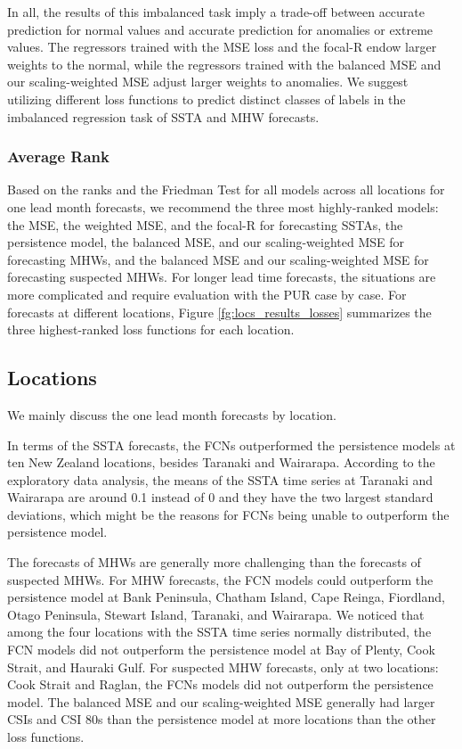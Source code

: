 \documentclass[11pt, a4paper]{article}
\begin{document}
In all, the results of this imbalanced task imply a trade-off between accurate prediction for normal values and accurate prediction for anomalies or extreme values. The regressors trained with the MSE loss and the focal-R endow larger weights to the normal, while the regressors trained with the balanced MSE and our scaling-weighted MSE adjust larger weights to anomalies. We suggest utilizing different loss functions to predict distinct classes of labels in the imbalanced regression task of SSTA and MHW forecasts.

\subsubsection{Average Rank}

Based on the ranks and the Friedman Test for all models across all locations for one lead month forecasts, we recommend the three most highly-ranked models: the MSE, the weighted MSE, and the focal-R for forecasting SSTAs, the persistence model, the balanced MSE, and our scaling-weighted MSE for forecasting MHWs, and the balanced MSE and our scaling-weighted MSE for forecasting suspected MHWs. For longer lead time forecasts, the situations are more complicated and require evaluation with the PUR case by case. For forecasts at different locations, Figure \ref{fg:locs_results_losses} summarizes the three highest-ranked loss functions for each location.

\subsection{Locations}

We mainly discuss the one lead month forecasts by location.

In terms of the SSTA forecasts, the FCNs outperformed the persistence models at ten New Zealand locations, besides Taranaki and Wairarapa. According to the exploratory data analysis, the means of the SSTA time series at Taranaki and Wairarapa are around 0.1 instead of 0 and they have the two largest standard deviations, which might be the reasons for FCNs being unable to outperform the persistence model.

The forecasts of MHWs are generally more challenging than the forecasts of suspected MHWs. For MHW forecasts, the FCN models could outperform the persistence model at Bank Peninsula, Chatham Island, Cape Reinga, Fiordland, Otago Peninsula, Stewart Island, Taranaki, and Wairarapa. We noticed that among the four locations with the SSTA time series normally distributed, the FCN models did not outperform the persistence model at Bay of Plenty, Cook Strait, and Hauraki Gulf. For suspected MHW forecasts, only at two locations: Cook Strait and Raglan, the FCNs models did not outperform the persistence model. The balanced MSE and our scaling-weighted MSE generally had larger CSIs and CSI 80s than the persistence model at more locations than the other loss functions.
\end{document}
